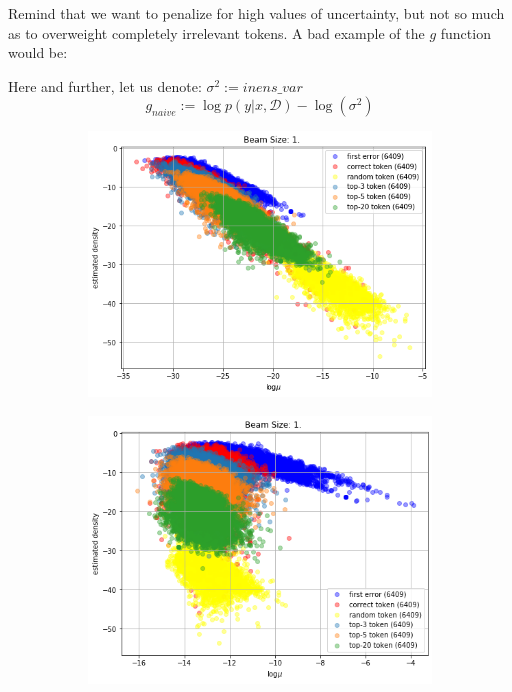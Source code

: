 \documentclass[a4paper,14pt]{extarticle}
\begin{document}
	Remind that we want to penalize for high values of uncertainty, but not so much as to overweight completely irrelevant tokens. A bad example of the $g$ function would be:
	
	Here and further, let us denote: $\sigma^2 := inens\_var$
	\begin{equation}
		g_{naive} := \log p(y | x, \mathcal{D}) - \log(\sigma^2)
	\end{equation}
	
		
	\begin{figure}[t]
		\begin{subfigure}{.5\textwidth}
			\includegraphics[width=\textwidth]{images/calibration_naive_scatter.png}
		\end{subfigure}
		\begin{subfigure}{.5\textwidth}
			\includegraphics[width=\textwidth]{images/calibration_lessnaive_scatter.png}
		\end{subfigure}
	\end{figure}
	
\end{document}
